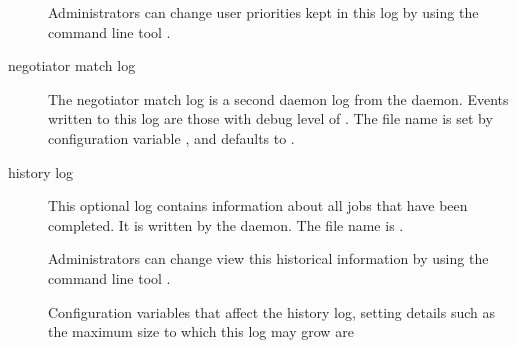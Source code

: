 \begin{description}
  Administrators can change user priorities kept in this log by using
  the command line tool .

\item[negotiator match log]
  The negotiator match log is a second daemon log from the 
  daemon. 
  Events written to this log are those with debug level of .
  The file name is set by configuration variable 
  ,
  and defaults to .
  
\item[history log]
  This optional log contains information about all jobs that have been
  completed.
  It is written by the  daemon.
  The file name is .

  Administrators can change view this historical information by using
  the command line tool .

  Configuration variables that affect the history log, 
  setting details such as
  the maximum size to which this log may grow are
  \begin{description}
  \item [] 
  \item [] 
  \item [] 
  \end{description}

\end{description}

